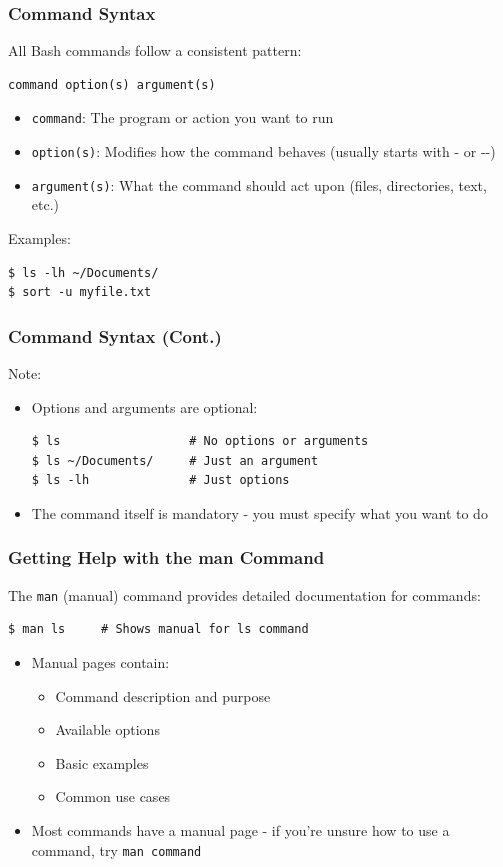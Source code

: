 \documentclass[10pt]{beamer}
\begin{document}
\begin{frame}[fragile]
    \frametitle{Command Syntax}
    All Bash commands follow a consistent pattern:
\begin{verbatim}
command option(s) argument(s)
\end{verbatim}
    \begin{itemize}
        \item \colorbox{gray!20}{\texttt{command}}: The program or action you want to run
        \item \colorbox{gray!20}{\texttt{option(s)}}: Modifies how the command behaves (usually starts with {-} or {-}{-})
        \item \colorbox{gray!20}{\texttt{argument(s)}}: What the command should act upon (files, directories, text, etc.)
    \end{itemize}
    
    Examples:
\begin{verbatim}
$ ls -lh ~/Documents/
$ sort -u myfile.txt
\end{verbatim}
\end{frame}

\begin{frame}[fragile]
    \frametitle{Command Syntax (Cont.)}
    Note:
    \begin{itemize}
        \item Options and arguments are optional:
        \begin{verbatim}
$ ls                  # No options or arguments
$ ls ~/Documents/     # Just an argument
$ ls -lh              # Just options
\end{verbatim}
        \item The command itself is mandatory - you must specify what you want to do
    \end{itemize}
\end{frame}

\begin{frame}[fragile]
    \frametitle{Getting Help with the man Command}
    The \texttt{man} (manual) command provides detailed documentation for commands:
\begin{verbatim}
$ man ls     # Shows manual for ls command
\end{verbatim}
    \begin{itemize}
        \item Manual pages contain:
        \begin{itemize}
            \item Command description and purpose
            \item Available options
            \item Basic examples
            \item Common use cases
        \end{itemize}
        \item Most commands have a manual page - if you're unsure how to use a command, try \texttt{man command}
    \end{itemize}
\end{frame}
\end{document}
